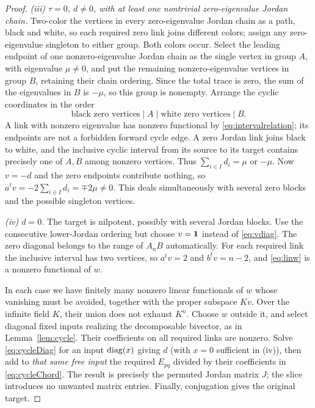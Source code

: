 \begin{proof}
\smallskip
\noindent\emph{(iii) $\tau=0$, $d\ne0$, with at least one
nontrivial zero-eigenvalue Jordan chain.}
Two-color the vertices in every zero-eigenvalue Jordan chain as a
path, black and white, so each required zero link joins different
colors; assign any zero-eigenvalue singleton to either group.
Both colors occur. Select the leading endpoint of one nonzero-eigenvalue Jordan
chain as the single vertex in group $A$, with eigenvalue
$\mu\ne0$, and put the remaining nonzero-eigenvalue vertices
in group $B$, retaining their chain ordering. Since the total trace is zero, the sum of the
eigenvalues in $B$ is $-\mu$, so this group is nonempty. Arrange
the cyclic coordinates in the order
\begin{equation}\label{eq:blackwhite}
 \text{black zero vertices}\;|\; A\;|\;
 \text{white zero vertices}\;|\; B.
\end{equation}
A link with nonzero eigenvalue has nonzero functional by
\eqref{eq:intervalrelation}; its endpoints are not a forbidden
forward cycle edge. A zero Jordan link joins black to white,
and the inclusive cyclic interval from its source to its target
contains precisely one of $A,B$ among nonzero vertices. Thus
$\sum_{i\in I}d_i=\mu$ or $-\mu$. Now $v=-d$ and the zero
endpoints contribute nothing, so
$ a^tv=-2\sum_{i\in I}d_i=\mp2\mu\ne0$.
This deals simultaneously with several zero blocks and the
possible singleton vertices.

\smallskip
\noindent\emph{(iv) $d=0$.}
The target is nilpotent, possibly with several Jordan blocks.
Use the consecutive lower-Jordan ordering but choose $v=\mathbf{1}$
instead of \eqref{eq:vdiag}. The zero diagonal belongs to the
range of $A_nB$ automatically. For each required link the
inclusive interval has two vertices, so
$ a^tv=2$ and $b^tv=n-2$, and \eqref{eq:linw} is a
nonzero functional of $w$.

\smallskip
In each case we have finitely many nonzero linear functionals of
$w$ whose vanishing must be avoided, together with the proper
subspace $Kv$. Over the infinite field $K$, their union does not
exhaust $K^n$. Choose $w$ outside it, and select diagonal fixed
inputs realizing the decomposable bivector, as in
Lemma~\ref{lem:cycle}. Their coefficients on all required links
are nonzero. Solve \eqref{eq:cycleDiag} for an input $\operatorname{diag}(x)$
giving $d$ (with $x=0$ sufficient in (iv)), then add to \emph{that
same free input} the required $E_{pq}$ divided by their
coefficients in \eqref{eq:cycleChord}. The result is precisely the
permuted Jordan matrix $J$; the slice introduces no unwanted
matrix entries. Finally, conjugation gives the original target.
\end{proof}


